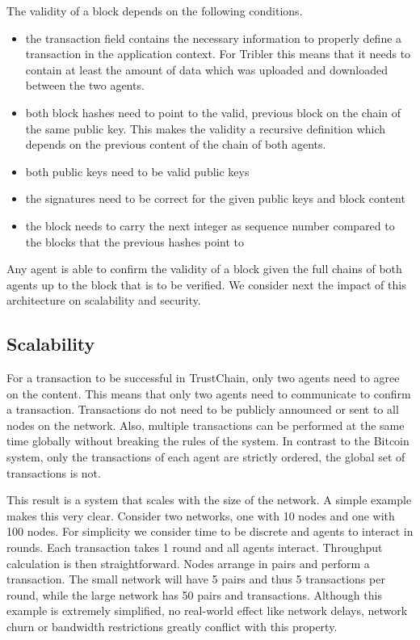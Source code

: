 The validity of a block depends on the following conditions. 

\begin{itemize}
    \item the transaction field contains the necessary information to properly define a transaction in the application context. For Tribler this
means that it needs to contain at least the amount of data which was uploaded and downloaded between
the two agents. 
    \item both block hashes need to point to the valid, previous block on the chain of the same public key. This makes the validity a recursive definition 
which depends on the previous content of the chain of both agents.
    \item both public keys need to be valid public keys
    \item the signatures need to be correct for the given public keys and block content
    \item the block needs to carry the next integer as sequence number compared to the blocks that the previous hashes point to
\end{itemize}

Any agent is able to confirm the validity of a block given the full chains of both agents up to the 
block that is to be verified. We consider next the impact of this architecture on scalability and
security.

\subsection{Scalability}
\label{sec:trustchain_scalability}
For a transaction to be successful in TrustChain, only two agents need to agree on the content. This
means that only two agents need to communicate to confirm a transaction. Transactions do not need to 
be publicly announced or sent to all nodes on
the network. Also, multiple transactions can be performed at the same time globally without breaking
the rules of the system. In contrast to the Bitcoin system, only the transactions of each agent are
strictly ordered, the global set of transactions is not.

This result is a system that scales with the size of the network. A simple example makes this very 
clear. Consider two networks, one with 10 nodes and one with 100 nodes. For simplicity we consider
time to be discrete and agents to interact in rounds. Each transaction takes 1 round and all agents 
interact. Throughput calculation is then straightforward. Nodes arrange in pairs and perform a
transaction. The small network will have 5 pairs and thus 5 transactions per round, while the large
network has 50 pairs and transactions. Although this example is extremely simplified, no real-world
effect like network delays, network churn or bandwidth restrictions greatly conflict with this property.

